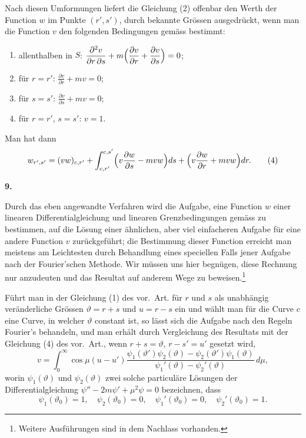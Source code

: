 \documentclass[12pt,a4paper]{article}
\begin{document}
Nach diesen Umformungen liefert die Gleichung (2) offenbar den Werth der Function $w$ im Punkte $(r', s')$, durch bekannte Gr\"ossen ausgedr\"uckt, wenn man die Function $v$ den folgenden Bedingungen gem\"ass bestimmt:

\begin{enumerate}
\item allenthalben in $S$: $\displaystyle\frac{\partial^{2}v}{\partial r\,\partial s} + m\Bigl(\frac{\partial v}{\partial r} + \frac{\partial v}{\partial s}\Bigr) = 0$;
\item f\"ur $r = r'$: $\displaystyle\frac{\partial v}{\partial r} + mv = 0$;
\item f\"ur $s = s'$: $\displaystyle\frac{\partial v}{\partial s} + mv = 0$;
\item f\"ur $r = r'$, $s = s'$: $v = 1$.
\end{enumerate}

Man hat dann
\begin{equation*}
w_{r',s'} = (vw)_{c,r'} + \int_{c,r'}^{c,s'}\Bigl(v\frac{\partial w}{\partial s} - mvw\Bigr)ds + \Bigl(v\frac{\partial w}{\partial r} + mvw\Bigr)dr.\tag{4}
\end{equation*}

\newpage
\begin{center}
\textbf{9.}
\end{center}

Durch das eben angewandte Verfahren wird die Aufgabe, eine Function $w$ einer linearen Differentialgleichung und linearen Grenzbedingungen gem\"ass zu bestimmen, auf die L\"osung einer \"ahnlichen, aber viel einfacheren Aufgabe f\"ur eine andere Function $v$ zur\"uckgef\"uhrt; die Bestimmung dieser Function erreicht man meistens am Leichtesten durch Behandlung eines speciellen Falls jener Aufgabe nach der Fourier'schen Methode. Wir m\"ussen uns hier begn\"ugen, diese Rechnung nur anzudeuten und das Resultat auf anderem Wege zu beweisen.\footnote{Weitere Ausf\"uhrungen sind in dem Nachlass vorhanden.}

F\"uhrt man in der Gleichung (1) des vor.~Art. f\"ur $r$ und $s$ als unabh\"angig ver\"anderliche Gr\"ossen $\vartheta = r + s$ und $u = r - s$ ein und w\"ahlt man f\"ur die Curve $c$ eine Curve, in welcher $\vartheta$ constant ist, so l\"asst sich die Aufgabe nach den Regeln Fourier's behandeln, und man erh\"alt durch Vergleichung des Resultats mit der Gleichung (4) des vor.~Art., wenn $r + s = \vartheta$, $r - s' = u'$ gesetzt wird,
\[
v = \int_{0}^{\infty}\cos\mu(u - u')\frac{\psi_{1}(\vartheta')\psi_{2}(\vartheta) - \psi_{2}(\vartheta')\psi_{1}(\vartheta)}{\psi_{1}'(\vartheta) - \psi_{2}'(\vartheta)}\,d\mu,
\]
worin $\psi_{1}(\vartheta)$ und $\psi_{2}(\vartheta)$ zwei solche particul\"are L\"osungen der Differentialgleichung $\psi'' - 2m\psi' + \mu^{2}\psi = 0$ bezeichnen, dass
\[
\psi_{1}(\vartheta_{0}) = 1,\quad \psi_{2}(\vartheta_{0}) = 0,\quad \psi_{1}'(\vartheta_{0}) = 0,\quad \psi_{2}'(\vartheta_{0}) = 1.
\]
\end{document}
